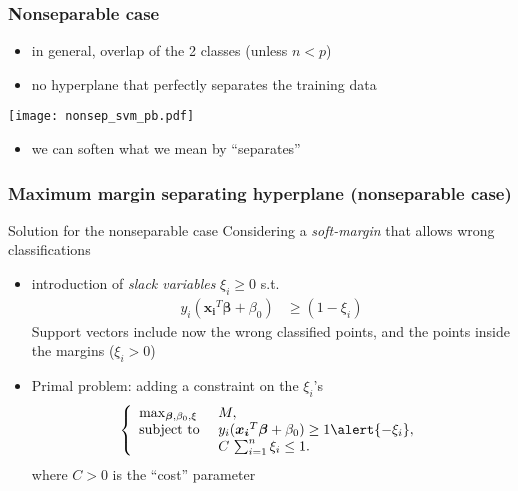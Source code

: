 \begin{frame}
   \frametitle{Nonseparable case}
   \begin{block}{}
      \begin{itemize}
      \item in general, overlap of the 2 classes (unless $n<p$)
      \item no hyperplane that perfectly separates the training data
      \end{itemize}
    \end{block}

   \begin{center}
      \texttt{[image: nonsep\_svm\_pb.pdf]}
   \end{center}
     \begin{itemize}
      \item[\doigtr] we can soften what we mean by ``separates''
      \end{itemize}
\end{frame}


\begin{frame}
   \frametitle{Maximum margin separating hyperplane (nonseparable case)}
   \begin{block}{Solution for the nonseparable case}
   Considering a {\em soft-margin} that allows  wrong classifications
      \begin{itemize}
      \item introduction of {\em slack variables} $\xi_i\ge 0$ s.t.
     \begin{align*}
         y_i(\boldsymbol{x_i}^T \boldsymbol{\beta} + \beta_0) & \ge (1-\xi_i)
      \end{align*}
      Support vectors include now the wrong classified points, and the points inside the margins ($\xi_i > 0$)
     \item Primal problem: adding a constraint on the $\xi_i$'s
     $$\left\{ \begin{array}{ll}
       \max_{\bbeta,\beta_0,\xi} & M,\\
       \textrm{subject to } &   y_i(\boldsymbol{x_i}^T \boldsymbol{\beta} + \beta_0)  \ge 1 \alert{-\xi_i}, \\
       & C\, \sum_{i=1}^n \xi_i \le 1.
      \end{array} \right.$$
      where $C>0$ is the ``cost'' parameter
      \end{itemize}
    \end{block}

\end{frame}


